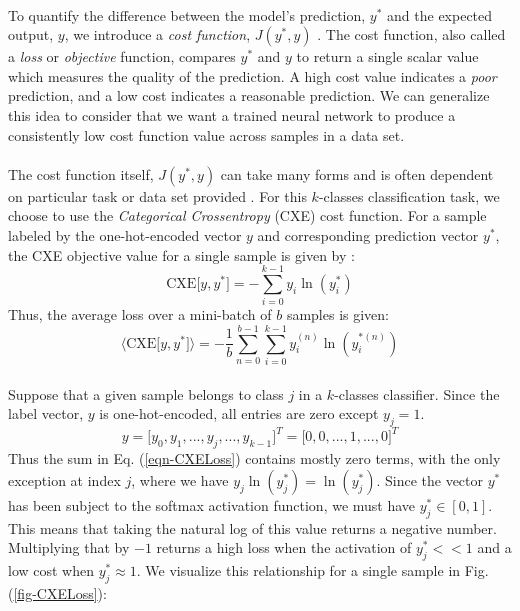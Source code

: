 \documentclass[12pt,letterpaper]{article}
\begin{document}
\paragraph*{}To quantify the difference between the model's prediction, $y^*$ and the expected output, $y$, we introduce a \textit{cost function}, $J(y^*,y)$ \cite{Goodfellow,James}. The cost function, also called a \textit{loss} or \textit{objective} function, compares $y^*$ and $y$ to return a single scalar value which measures the quality of the prediction. A high cost value indicates a \textit{poor} prediction, and a low cost indicates a reasonable prediction. We can generalize this idea to consider that we want a trained neural network to produce a consistently low cost function value across samples in a data set.

\paragraph*{}The cost function itself, $J(y^*,y)$ can take many forms and is often dependent on particular task or data set provided \cite{James}. For this $k$-classes classification task, we choose to use the \textit{Categorical Crossentropy} (CXE) cost function. For a sample labeled by the one-hot-encoded vector $y$ and corresponding prediction vector $y^*$, the CXE objective value for a single sample is given by \cite{Bishop,Goodfellow,Virtanen}:
\begin{equation}
\label{eqn-CXELoss}
\text{CXE}\big[ y , y^* \big] = - \sum_{i=0}^{k-1} y_i \ln(y^*_i) 
\end{equation}
Thus, the average loss over a mini-batch of $b$ samples is given:
\begin{equation}
\label{eqn-CXELossAvg}
\big\langle \text{CXE}\big[ y , y^* \big]\big\rangle = 
- \frac{1}{b}\sum_{n=0}^{b-1}\sum_{i=0}^{k-1} y_i^{(n)} \ln(y^{*(n)}_i) 
\end{equation}

\paragraph*{}Suppose that a given sample belongs to class $j$ in a $k$-classes classifier. Since the label vector, $y$ is one-hot-encoded, all entries are zero except $y_{j} = 1$.
\begin{equation}
y = \big[y_0,y_1, ... , y_{j} , ..., y_{k-1} \big]^T  = 
\big[0,0, ... , 1 , ...,0 \big]^T
\end{equation}
Thus the sum in Eq. (\ref{eqn-CXELoss}) contains mostly zero terms, with the only exception at index $j$, where we have $y_j\ln(y^*_j) = \ln(y^*_j)$. Since the vector $y^*$ has been subject to the softmax activation function, we must have $y^*_j \in [0,1]$. This means that taking the natural log of this value returns a negative number. Multiplying that by $-1$ returns a high loss when the activation of $y^*_j << 1$ and a low cost when $y^*_j \approx 1$. We visualize this relationship for a single sample in Fig. (\ref{fig-CXELoss}):
\end{document}
